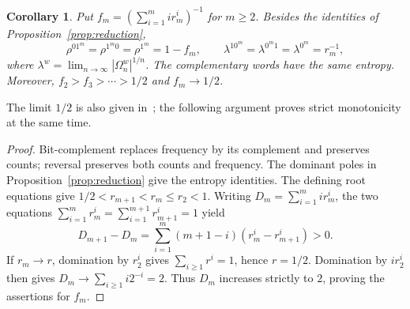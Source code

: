 \documentclass[11pt]{article}
\newtheorem{corollary}[theorem]{Corollary}
\newcommand{\Om}{\Omega}
\begin{document}
\begin{corollary}\label{cor:families}
Put $f_m=(\sum_{i=1}^m i r_m^i)^{-1}$ for $m\geq2$.
Besides the identities of Proposition~\ref{prop:reduction},
\[
 \rho^{01^m}=\rho^{1^m0}=\rho^{1^m}=1-f_m,
 \qquad
 \lambda^{10^m}=\lambda^{0^m1}=\lambda^{0^m}=r_m^{-1},
\]
where $\lambda^w=\lim_{n\to\infty}|\Om_n^w|^{1/n}$.
The complementary words have the same entropy. Moreover,
$f_2>f_3>\cdots>1/2$ and $f_m\to1/2$.
\end{corollary}
The limit $1/2$ is also given in~\cite[Corollary~1]{BKV};
the following argument proves strict monotonicity at the same time.
\begin{proof}
Bit-complement replaces frequency by its complement and preserves counts;
reversal preserves both counts and frequency. The dominant poles in
Proposition~\ref{prop:reduction} give the entropy identities.
The defining root equations give $1/2<r_{m+1}<r_m\leq r_2<1$.
Writing $D_m=\sum_{i=1}^m i r_m^i$, the two equations
$\sum_{i=1}^m r_m^i=\sum_{i=1}^{m+1}r_{m+1}^i=1$ yield
\[
 D_{m+1}-D_m=
 \sum_{i=1}^m(m+1-i)(r_m^i-r_{m+1}^i)>0.
\]
If $r_m\to r$, domination by $r_2^i$ gives
$\sum_{i\geq1}r^i=1$, hence $r=1/2$.
Domination by $i r_2^i$ then gives $D_m\to\sum_{i\geq1}i2^{-i}=2$.
Thus $D_m$ increases strictly to $2$, proving the assertions for $f_m$.
\end{proof}
\end{document}
